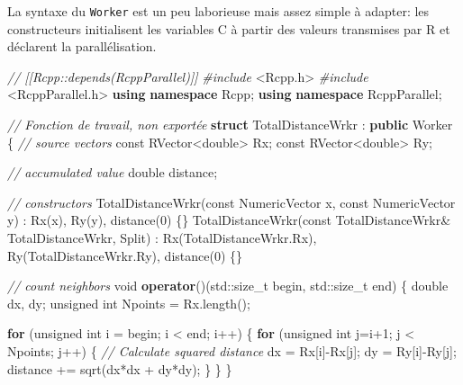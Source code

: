 \documentclass[
  11pt,
  french,
  a4paper,
  extrafontsizes,onecolumn,openright
  ]{memoir}
\newenvironment{Shaded}{\begin{snugshade}}{\end{snugshade}}
\newcommand{\AttributeTok}[1]{\textcolor[rgb]{0.77,0.63,0.00}{#1}}
\newcommand{\BuiltInTok}[1]{#1}
\newcommand{\CommentTok}[1]{\textcolor[rgb]{0.56,0.35,0.01}{\textit{#1}}}
\newcommand{\ControlFlowTok}[1]{\textcolor[rgb]{0.13,0.29,0.53}{\textbf{#1}}}
\newcommand{\DataTypeTok}[1]{\textcolor[rgb]{0.13,0.29,0.53}{#1}}
\newcommand{\DecValTok}[1]{\textcolor[rgb]{0.00,0.00,0.81}{#1}}
\newcommand{\ImportTok}[1]{#1}
\newcommand{\KeywordTok}[1]{\textcolor[rgb]{0.13,0.29,0.53}{\textbf{#1}}}
\newcommand{\NormalTok}[1]{#1}
\newcommand{\PreprocessorTok}[1]{\textcolor[rgb]{0.56,0.35,0.01}{\textit{#1}}}
\begin{document}
La syntaxe du \texttt{Worker} est un peu laborieuse mais assez simple à adapter: les constructeurs initialisent les variables C à partir des valeurs transmises par R et déclarent la parallélisation.

\scriptsize

\begin{Shaded}
\begin{Highlighting}[]
\CommentTok{// [[Rcpp::depends(RcppParallel)]]}
\PreprocessorTok{\#include }\ImportTok{\textless{}Rcpp.h\textgreater{}}
\PreprocessorTok{\#include }\ImportTok{\textless{}RcppParallel.h\textgreater{}}
\KeywordTok{using} \KeywordTok{namespace}\NormalTok{ Rcpp;}
\KeywordTok{using} \KeywordTok{namespace}\NormalTok{ RcppParallel;}

\CommentTok{// Fonction de travail, non exportée}
\KeywordTok{struct}\NormalTok{ TotalDistanceWrkr : }\KeywordTok{public}\NormalTok{ Worker}
\NormalTok{\{}
  \CommentTok{// source vectors}
  \AttributeTok{const}\NormalTok{ RVector\textless{}}\DataTypeTok{double}\NormalTok{\textgreater{} Rx;}
  \AttributeTok{const}\NormalTok{ RVector\textless{}}\DataTypeTok{double}\NormalTok{\textgreater{} Ry;}
  
  \CommentTok{// accumulated value}
  \DataTypeTok{double}\NormalTok{ distance;}
   
  \CommentTok{// constructors}
\NormalTok{  TotalDistanceWrkr(}\AttributeTok{const}\NormalTok{ NumericVector x, }\AttributeTok{const}\NormalTok{ NumericVector y) :}
\NormalTok{    Rx(x), Ry(y), distance(}\DecValTok{0}\NormalTok{) \{\}}
\NormalTok{  TotalDistanceWrkr(}\AttributeTok{const}\NormalTok{ TotalDistanceWrkr\& TotalDistanceWrkr, Split) :}
\NormalTok{    Rx(TotalDistanceWrkr.Rx), Ry(TotalDistanceWrkr.Ry),  distance(}\DecValTok{0}\NormalTok{) \{\}}
  
  \CommentTok{// count neighbors}
  \DataTypeTok{void} \KeywordTok{operator}\NormalTok{()(}\BuiltInTok{std::}\NormalTok{size\_t begin, }\BuiltInTok{std::}\NormalTok{size\_t end) \{}
    \DataTypeTok{double}\NormalTok{ dx, dy;}
    \DataTypeTok{unsigned} \DataTypeTok{int}\NormalTok{ Npoints = Rx.length();}

    \ControlFlowTok{for}\NormalTok{ (}\DataTypeTok{unsigned} \DataTypeTok{int}\NormalTok{ i = begin; i \textless{} end; i++) \{}
      \ControlFlowTok{for}\NormalTok{ (}\DataTypeTok{unsigned} \DataTypeTok{int}\NormalTok{ j=i+}\DecValTok{1}\NormalTok{; j \textless{} Npoints; j++) \{}
          \CommentTok{// Calculate squared distance}
\NormalTok{          dx = Rx[i]{-}Rx[j];}
\NormalTok{          dy = Ry[i]{-}Ry[j];}
\NormalTok{          distance += sqrt(dx*dx + dy*dy);}
\NormalTok{      \}}
\NormalTok{    \}}
\NormalTok{  \}}


\end{Highlighting}
\end{Shaded}
\end{document}
